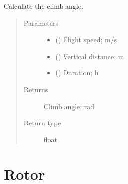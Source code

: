 \documentclass[letterpaper,10pt,english]{sphinxmanual}
\begin{document}
\begin{fulllineitems}
\label{\detokenize{modules/mission:mission.get_climb_angle}}
\sphinxAtStartPar
Calculate the climb angle.
\begin{quote}\begin{description}
\item[{Parameters}] \leavevmode\begin{itemize}
\item {} 
\sphinxAtStartPar
{} () \textendash{} Flight speed; m/s

\item {} 
\sphinxAtStartPar
{} () \textendash{} Vertical distance; m

\item {} 
\sphinxAtStartPar
{} () \textendash{} Duration; h

\end{itemize}

\item[{Returns}] \leavevmode
\sphinxAtStartPar
Climb angle; rad

\item[{Return type}] \leavevmode
\sphinxAtStartPar
float

\end{description}\end{quote}

\end{fulllineitems}



\section{Rotor}
\label{\detokenize{modules/rotor:module-rotor}}\label{\detokenize{modules/rotor:rotor}}\label{\detokenize{modules/rotor::doc}}
\end{document}
